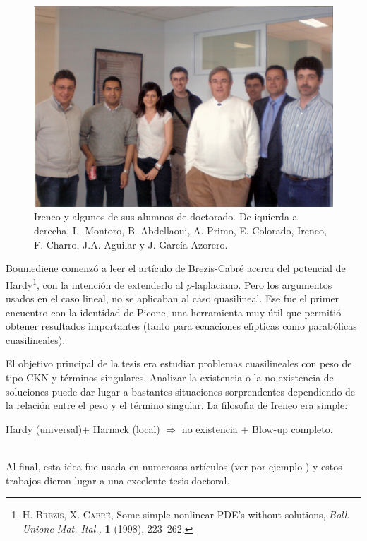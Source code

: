 \begin{figure}%
\begin{center}
\includegraphics[width=0.9\linewidth]{IP_foto_Alumnos.jpg}
\caption{Ireneo y algunos de sus alumnos de doctorado. De iquierda a derecha, L. Montoro, B. Abdellaoui, A. Primo, E. Colorado, Ireneo, F. Charro, J.A. Aguilar y J. Garc\'ia Azorero.}
\end{center}
\end{figure}


Boumediene comenz\'o a leer el art\'iculo de Brezis-Cabr\'e acerca del potencial de Hardy\footnote{\textsc{H. Brezis, X. Cabr\'e}, Some simple nonlinear PDE's without solutions, \textit{Boll. Unione Mat. Ital.,} \textbf{1} (1998), 223--262.}, con la intenci\'on de extenderlo al $p$-laplaciano. Pero los argumentos usados en el caso lineal, no se aplicaban al caso quasilineal. Ese fue el primer encuentro con la identidad de Picone, una herramienta muy \'util que permiti\'o obtener resultados importantes (tanto para ecuaciones el\'{\i}pticas como parab\'olicas cuasilineales).
 
El objetivo principal de la tesis era estudiar problemas cuasilineales con peso de tipo CKN y t\'erminos singulares. Analizar la existencia o la no existencia de soluciones puede dar lugar a bastantes situaciones sorprendentes dependiendo de la relaci\'on entre el peso y el t\'ermino singular. La filosof\'{\i}a de Ireneo era simple:\\
\centerline{Hardy (universal)+ Harnack (local) $\Rightarrow$ no existencia + Blow-up completo.}\\
Al final, esta idea fue usada en numerosos art\'iculos  {(ver por ejemplo \cite{AP2})}  y estos trabajos dieron lugar a una excelente tesis doctoral.

